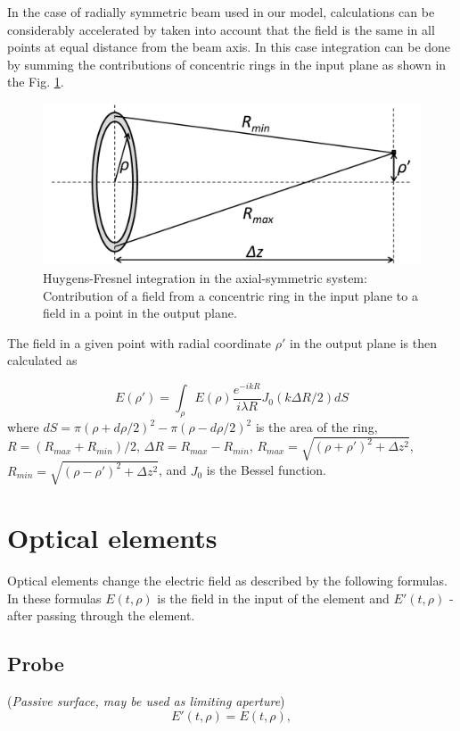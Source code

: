 \documentclass{report}
\begin{document}
In the case of radially symmetric beam used in our model, calculations can be considerably accelerated by taken into account that the field is the same in all points at equal distance from the beam axis. In this case integration can be done by summing the contributions of concentric rings in the input plane as shown in the Fig. \ref{fig:Huygens-Fresnel}.

\begin{figure}[ht]
\centering
\includegraphics[width=120mm]{images/huygens-fresnel}
\caption{Huygens-Fresnel integration in the axial-symmetric system: Contribution of a field from a concentric ring in the input plane to a field in a point in the output plane.}\label{fig:Huygens-Fresnel}
\end{figure}

The field in a given point with radial coordinate $\rho'$ in the output plane is then calculated as

\begin{equation}
E(\rho') = \int_{\rho}E(\rho)\frac{e^{-ikR}}{i\lambda R} J_0(k\Delta R/2) dS
\end{equation}
where $dS = \pi(\rho+d\rho/2)^2-\pi(\rho-d\rho/2)^2$ is the area of the ring, $R=(R_{max}+R_{min})/2$, $\Delta R=R_{max}-R_{min}$, $R_{max}=\sqrt{(\rho+\rho')^2+\Delta z^2}$, $R_{min}=\sqrt{(\rho-\rho')^2+\Delta z^2}$, and $J_0$ is the Bessel function.

\section{Optical elements}
Optical elements change the electric field as described by the following formulas. In these formulas $E(t,\rho)$ is the field in the input of the element and $E'(t,\rho)$ - after passing through the element.

\subsection*{Probe}
(\textit{Passive surface, may be used as limiting aperture})
\begin{equation*}
E'(t,\rho) = E(t,\rho),
\end{equation*}
\end{document}
